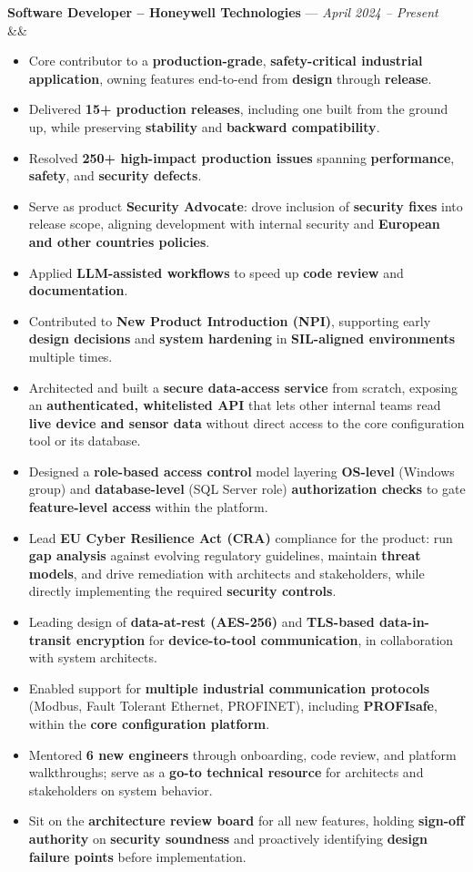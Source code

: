\documentclass[a4paper,9pt]{extarticle}
\newcommand{\resumeItem}[1]{\item\small{#1}}
\newenvironment{resumeItemList}
  {\begin{itemize}[leftmargin=1.1em,labelsep=0.45em,topsep=1pt,parsep=0pt,itemsep=2pt,label=$\circ$]}
  {\end{itemize}\vspace{-1pt}}
\newcommand{\roleHeading}[4]{%
  \vspace{3pt}%
  \textbf{#1} --- #2 \hfill \textit{#3}\\[1pt]%
  \ifx&#4&\else \textit{\small #4}\\[1pt]\fi
}
\begin{document}
\roleHeading{Software Developer -- Honeywell Technologies}{}{April 2024 -- Present}{}
\begin{resumeItemList}
    \resumeItem{Core contributor to a \textbf{production-grade}, \textbf{safety-critical industrial application}, owning features end-to-end from \textbf{design} through \textbf{release}.}
  \resumeItem{Delivered \textbf{15+ production releases}, including one built from the ground up, while preserving \textbf{stability} and \textbf{backward compatibility}.}
  \resumeItem{Resolved \textbf{250+ high-impact production issues} spanning \textbf{performance}, \textbf{safety}, and \textbf{security defects}.}
  \resumeItem{Serve as product \textbf{Security Advocate}: drove inclusion of \textbf{security fixes} into release scope, aligning development with internal security and \textbf{European and other countries policies}.}
  \resumeItem{Applied \textbf{LLM-assisted workflows} to speed up \textbf{code review} and \textbf{documentation}.}
  \resumeItem{Contributed to \textbf{New Product Introduction (NPI)}, supporting early \textbf{design decisions} and \textbf{system hardening} in \textbf{SIL-aligned environments} multiple times.}
  \resumeItem{Architected and built a \textbf{secure data-access service} from scratch, exposing an \textbf{authenticated, whitelisted API} that lets other internal teams read \textbf{live device and sensor data} without direct access to the core configuration tool or its database.}
  \resumeItem{Designed a \textbf{role-based access control} model layering \textbf{OS-level} (Windows group) and \textbf{database-level} (SQL Server role) \textbf{authorization checks} to gate \textbf{feature-level access} within the platform.}
  \resumeItem{Lead \textbf{EU Cyber Resilience Act (CRA)} compliance for the product: run \textbf{gap analysis} against evolving regulatory guidelines, maintain \textbf{threat models}, and drive remediation with architects and stakeholders, while directly implementing the required \textbf{security controls}.}
  \resumeItem{Leading design of \textbf{data-at-rest (AES-256)} and \textbf{TLS-based data-in-transit encryption} for \textbf{device-to-tool communication}, in collaboration with system architects.}
  \resumeItem{Enabled support for \textbf{multiple industrial communication protocols} (Modbus, Fault Tolerant Ethernet, PROFINET), including \textbf{PROFIsafe}, within the \textbf{core configuration platform}.}
  \resumeItem{Mentored \textbf{6 new engineers} through onboarding, code review, and platform walkthroughs; serve as a \textbf{go-to technical resource} for architects and stakeholders on system behavior.}
  \resumeItem{Sit on the \textbf{architecture review board} for all new features, holding \textbf{sign-off authority} on \textbf{security soundness} and proactively identifying \textbf{design failure points} before implementation.}
\end{resumeItemList}
\end{document}
